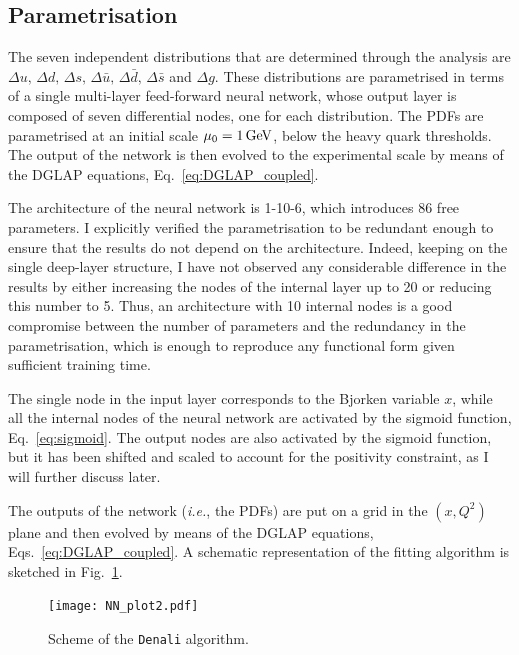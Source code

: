 \subsection{Parametrisation}
The seven independent distributions that are determined through the analysis are $\Delta u, \, \Delta d, \, \Delta s, \, \Delta \bar{u}, \, \Delta \bar{d}, \, \Delta \bar{s}$ and $\Delta g$. These distributions are parametrised in terms of a single multi-layer feed-forward neural network, whose output layer is composed of seven differential nodes, one for each distribution. The PDFs are parametrised at an initial scale $\mu_0 = 1\,\textrm{GeV}$, below the heavy quark thresholds. The output of the network is then evolved to the experimental scale by means of the DGLAP equations, Eq.~\eqref{eq:DGLAP_coupled}.

The architecture of the neural network is 1-10-6, which introduces 86 free parameters. I explicitly verified the parametrisation to be redundant enough to ensure that the results do not depend on the architecture. Indeed, keeping on the single deep-layer structure, I have not observed any considerable difference in the results by either increasing the nodes of the internal layer up to 20 or reducing this number to 5. Thus, an architecture with 10 internal nodes is a good compromise between the number of parameters and the redundancy in the parametrisation, which is enough to reproduce any functional form given sufficient training time.%

The single node in the input layer corresponds to the Bjorken variable $x$, while all the internal nodes of the neural network are activated by the sigmoid function, Eq.~\eqref{eq:sigmoid}. The output nodes are also activated by the sigmoid function, but it has been shifted and scaled to account for the positivity constraint, as I will further discuss later.%
 
The outputs of the network (\textit{i.e.}, the PDFs) are put on a grid in the $(x,Q^2)$ plane and then evolved by means of the DGLAP equations, Eqs.~\eqref{eq:DGLAP_coupled}. A schematic representation of the fitting algorithm is sketched in Fig.~\ref{fig:NN_plot}.
\begin{figure}[t]
  \centering
  \texttt{[image: NN\_plot2.pdf]} 
  \caption{\small{Scheme of the \texttt{Denali} algorithm.}}
  \label{fig:NN_plot}
\end{figure}


